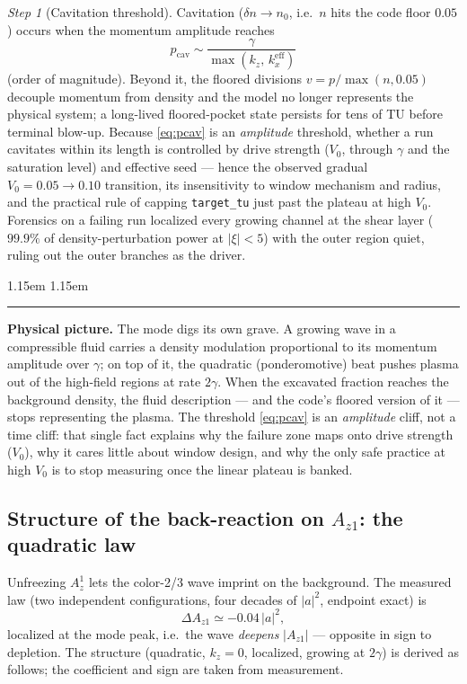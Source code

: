 \documentclass[11pt,a4paper]{article}
\numberwithin{equation}{section}
\theoremstyle{remark}
\newtheorem{step}{Step}[subsection]
\newenvironment{intuition}%
{\par\medskip\noindent
 \begin{list}{}{\leftmargin 1.15em \rightmargin 1.15em \listparindent 0pt
 \itemindent 0pt \parsep 2pt \topsep 2pt}\item\relax
 \small\textcolor{intu}{\rule[-0.6ex]{2.6pt}{2.4ex}}\hspace{0.55em}%
 \textcolor{intu}{\textbf{Physical picture.}}\hspace{0.5em}\ignorespaces}%
{\end{list}\medskip}
\newcommand{\Vo}{V_0}
\newcommand{\kz}{k_z}
\newcommand{\Az}{A_{z1}}
\begin{document}
\begin{step}[Cavitation threshold]
Cavitation ($\delta n\to n_0$, i.e.\ $n$ hits the code floor $0.05$)
occurs when the momentum amplitude reaches
\begin{equation}
\boxed{\;p_{\mathrm{cav}}\sim\frac{\gamma}{\max(\kz,\,k_x^{\mathrm{eff}})}\;}
\label{eq:pcav}
\end{equation}
(order of magnitude). Beyond it, the floored divisions
$v=p/\max(n,0.05)$ decouple momentum from density and the model no longer
represents the physical system; a long-lived floored-pocket state persists
for tens of TU before terminal blow-up. Because \eqref{eq:pcav} is an
\emph{amplitude} threshold, whether a run cavitates within its length is
controlled by drive strength ($\Vo$, through $\gamma$ and the saturation
level) and effective seed --- hence the observed gradual
$\Vo=0.05\to0.10$ transition, its insensitivity to window mechanism and
radius, and the practical rule of capping \texttt{target\_tu} just past
the plateau at high $\Vo$. Forensics on a failing run localized every
growing channel at the shear layer ($99.9\%$ of density-perturbation
power at $|\xi|<5$) with the outer region quiet, ruling out the outer
branches as the driver.
\end{step}

\begin{intuition}
The mode digs its own grave. A growing wave in a compressible fluid
carries a density modulation proportional to its momentum amplitude over
$\gamma$; on top of it, the quadratic (ponderomotive) beat pushes plasma
out of the high-field regions at rate $2\gamma$. When the excavated
fraction reaches the background density, the fluid description --- and
the code's floored version of it --- stops representing the plasma.
The threshold \eqref{eq:pcav} is an \emph{amplitude} cliff, not a time
cliff: that single fact explains why the failure zone maps onto drive
strength ($\Vo$), why it cares little about window design, and why the
only safe practice at high $\Vo$ is to stop measuring once the linear
plateau is banked.
\end{intuition}

\subsection{Structure of the back-reaction on $\Az$: the quadratic law}
\label{ssec:backreaction}

Unfreezing $A_z^1$ lets the color-2/3 wave imprint on the background. The
measured law (two independent configurations, four decades of $|a|^2$,
endpoint exact) is
\begin{equation}
\Delta\Az\simeq-0.04\,|a|^2 ,
\label{eq:dazlaw}
\end{equation}
localized at the mode peak, i.e.\ the wave \emph{deepens} $|\Az|$ ---
opposite in sign to depletion. The structure (quadratic, $\kz=0$,
localized, growing at $2\gamma$) is derived as follows; the coefficient
and sign are taken from measurement.
\end{document}

